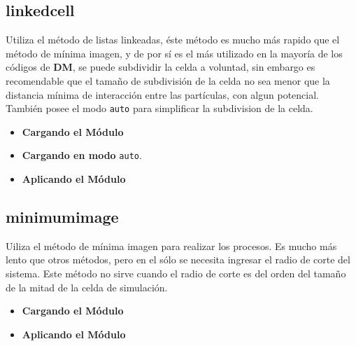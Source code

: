 \subsection{linkedcell}
Utiliza el m\'etodo de listas linkeadas, \'este m\'etodo es mucho m\'as rapido que el m\'etodo de m\'inima imagen, y de por s\'i es el m\'as utilizado en la mayor\'ia de los c\'odigos de \textbf{DM}, se puede subdividir la celda a voluntad, sin embargo es recomendable que el tama\~no de subdivisi\'on de la celda no sea menor que la distancia m\'inima de interacci\'on entre las part\'iculas, con algun potencial. Tambi\'en posee el modo \verb|auto| para simplificar la subdivision de la celda.

\begin{itemize}
 \item \textbf{Cargando el M\'odulo}
 \item \textbf{Cargando en modo} \texttt{auto}.
 \item \textbf{Aplicando el M\'odulo}
\end{itemize}

\subsection{minimumimage}
Uiliza el m\'etodo de m\'inima imagen para realizar los procesos. Es mucho m\'as lento que otros m\'etodos, pero en el s\'olo se necesita ingresar el radio de corte del sistema. Este m\'etodo no sirve cuando el radio de corte es del orden del tama\~no de la mitad de la celda de simulaci\'on.

\begin{itemize}
 \item \textbf{Cargando el M\'odulo}
 \item \textbf{Aplicando el M\'odulo}
\end{itemize}

